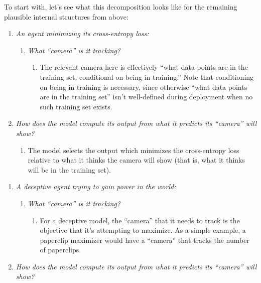 {To start with, let's see what this decomposition looks like for the remaining plausible internal structures from above:



\begin{enumerate}
\item \textit{An agent minimizing its cross-entropy loss:}
    \begin{enumerate}
    \item \textit{What ``camera'' is it tracking?}
        \begin{enumerate}
        \item The relevant camera here is effectively ``what data points are in the training set, conditional on being in training.'' Note that conditioning on being in training is necessary, since otherwise ``what data points are in the training set'' isn't well-defined during deployment when no such training set exists.
        \end{enumerate}
\end{enumerate}
    \item \textit{How does the model compute its output from what it predicts its ``camera'' will show?}
        \begin{enumerate}
        \item The model selects the output which minimizes the cross-entropy loss relative to what it thinks the camera will show (that is, what it thinks will be in the training set).
        \end{enumerate}
    \end{enumerate}
\begin{enumerate}
\item \textit{A deceptive agent trying to gain power in the world:}
    \begin{enumerate}
    \item \textit{What ``camera'' is it tracking?}
        \begin{enumerate}
        \item For a deceptive model, the ``camera'' that it needs to track is the objective that it's attempting to maximize. As a simple example, a paperclip maximizer would have a ``camera'' that tracks the number of paperclips.
        \end{enumerate}
\end{enumerate}
    \item \textit{How does the model compute its output from what it predicts its ``camera'' will show?}
        \begin{enumerate}

\end{enumerate}
\end{enumerate}}
